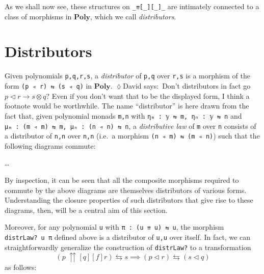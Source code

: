 \documentclass[
  11pt,
  oneside,
  article]{memoir}
\theoremstyle{definition}
\theoremstyle{plain}
\newcommand{\Cat}[1]{\mathbf{#1}}%
\newcommand{\poly}{\Cat{Poly}}
\newcommand{\0}{\textsf{0}}
\newcommand{\1}{\tn{\textsf{1}}}
\newcommand{\tri}{\mathbin{\triangleleft}}
\newcommand{\dnote}[1]{{\quad \color{blue}$\lozenge$\;David says:}~#1\;{\color{blue}$\lozenge$}\quad}
\begin{document}
As we shall now see, these structures on \texttt{\_⇈{[}\_{]}{[}\_{]}\_}
are intimately connected to a class of morphisms in \(\poly\),
which we call \emph{distributors}.

\section{Distributors}\label{distributors}

Given polynomials \texttt{p,q,r,s}, a \emph{distributor} of \texttt{p,q}
over \texttt{r,s} is a morphism of the form
\texttt{(p\ ◃\ r)\ ⇆\ (s\ ◃\ q)} in \(\poly\). \dnote{Don't distributors in fact go $p\tri r\to s\otimes q$? Even if you don't want that to be the displayed form, I think a footnote would be worthwhile.} The name
``distributor'' is here drawn from the fact that, given polynomial
monads \texttt{m,n} with \texttt{ηₘ\ :\ 𝕪\ ⇆\ m,\ ηₙ\ :\ 𝕪\ ⇆\ n} and
\texttt{μₘ\ :\ (m\ ◃\ m)\ ⇆\ m,\ μₙ\ :\ (n\ ◃\ n)\ ⇆\ n}, a
\emph{distributive law} of \texttt{m} over \texttt{n} consists of a
distributor of \texttt{n,n} over \texttt{n,n} (i.e.~a morphism
\texttt{(n\ ◃\ m)\ ⇆\ (m\ ◃\ n)}) such that the following diagrams
commute:

\ldots{}

By inspection, it can be seen that all the composite morphisms required
to commute by the above diagrams are themselves distributors of various
forms. Understanding the closure properties of such distributors that
give rise to these diagrams, then, will be a central aim of this
section.

Moreover, for any polynomial \texttt{u} with
\texttt{π\ :\ (u\ ⇈\ u)\ ⇆\ u}, the morphism \texttt{distrLaw?\ u\ π}
defined above is a distributor of \texttt{u,u} over itself. In fact, we
can straightforwardly generalize the construction of \texttt{distrLaw?}
to a transformation \[
(p ~{\upuparrows}[q][f] r) \leftrightarrows s \implies (p \triangleleft r) \leftrightarrows (s \triangleleft q)
\] as follows:
\end{document}

